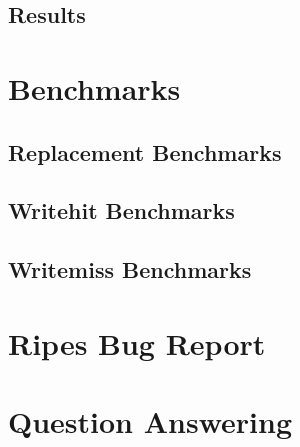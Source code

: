 \documentclass[utf8]{article}
\begin{document}
\subsection{Results}

\section{Benchmarks}
\subsection{Replacement Benchmarks}
\subsection{Writehit Benchmarks}
\subsection{Writemiss Benchmarks}

\section{Ripes Bug Report}

\section{Question Answering}

\end{document}
